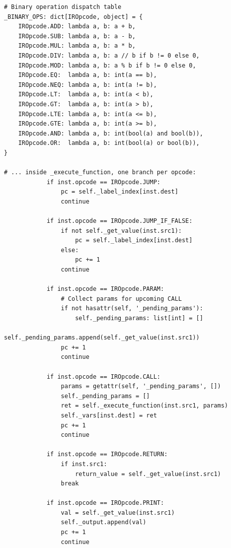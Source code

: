 \begin{lstlisting}[style=snippet]
# Binary operation dispatch table
_BINARY_OPS: dict[IROpcode, object] = {
    IROpcode.ADD: lambda a, b: a + b,
    IROpcode.SUB: lambda a, b: a - b,
    IROpcode.MUL: lambda a, b: a * b,
    IROpcode.DIV: lambda a, b: a // b if b != 0 else 0,
    IROpcode.MOD: lambda a, b: a % b if b != 0 else 0,
    IROpcode.EQ:  lambda a, b: int(a == b),
    IROpcode.NEQ: lambda a, b: int(a != b),
    IROpcode.LT:  lambda a, b: int(a < b),
    IROpcode.GT:  lambda a, b: int(a > b),
    IROpcode.LTE: lambda a, b: int(a <= b),
    IROpcode.GTE: lambda a, b: int(a >= b),
    IROpcode.AND: lambda a, b: int(bool(a) and bool(b)),
    IROpcode.OR:  lambda a, b: int(bool(a) or bool(b)),
}

# ... inside _execute_function, one branch per opcode:
            if inst.opcode == IROpcode.JUMP:
                pc = self._label_index[inst.dest]
                continue

            if inst.opcode == IROpcode.JUMP_IF_FALSE:
                if not self._get_value(inst.src1):
                    pc = self._label_index[inst.dest]
                else:
                    pc += 1
                continue

            if inst.opcode == IROpcode.PARAM:
                # Collect params for upcoming CALL
                if not hasattr(self, '_pending_params'):
                    self._pending_params: list[int] = []
                self._pending_params.append(self._get_value(inst.src1))
                pc += 1
                continue

            if inst.opcode == IROpcode.CALL:
                params = getattr(self, '_pending_params', [])
                self._pending_params = []
                ret = self._execute_function(inst.src1, params)
                self._vars[inst.dest] = ret
                pc += 1
                continue

            if inst.opcode == IROpcode.RETURN:
                if inst.src1:
                    return_value = self._get_value(inst.src1)
                break

            if inst.opcode == IROpcode.PRINT:
                val = self._get_value(inst.src1)
                self._output.append(val)
                pc += 1
                continue
\end{lstlisting}

